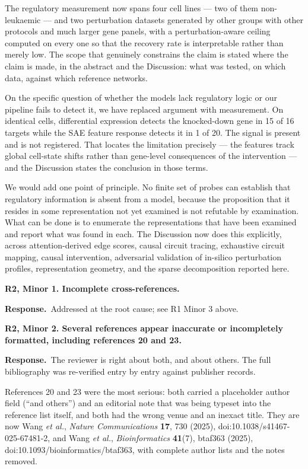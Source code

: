 \documentclass[11pt]{article}
\newcommand{\point}[1]{\vspace{0.7em}\noindent\textbf{#1}\par\vspace{0.15em}}
\newcommand{\reply}{\par\vspace{0.3em}\noindent\textbf{Response.}\ }
\begin{document}
The regulatory measurement now spans four cell lines --- two of them non-leukaemic --- and two
perturbation datasets generated by other groups with other protocols and much larger gene panels,
with a perturbation-aware ceiling computed on every one so that the recovery rate is interpretable
rather than merely low. The scope that genuinely constrains the claim is stated where the claim is
made, in the abstract and the Discussion: what was tested, on which data, against which reference
networks.

On the specific question of whether the models lack regulatory logic or our pipeline fails to
detect it, we have replaced argument with measurement. On identical cells, differential expression
detects the knocked-down gene in 15 of 16 targets while the SAE feature response detects it in 1 of
20. The signal is present and is not registered. That locates the limitation precisely --- the
features track global cell-state shifts rather than gene-level consequences of the intervention ---
and the Discussion states the conclusion in those terms.

We would add one point of principle. No finite set of probes can establish that regulatory
information is absent from a model, because the proposition that it resides in some representation
not yet examined is not refutable by examination. What can be done is to enumerate the
representations that have been examined and report what was found in each. The Discussion now does
this explicitly, across attention-derived edge scores, causal circuit tracing, exhaustive circuit
mapping, causal intervention, adversarial validation of in-silico perturbation profiles,
representation geometry, and the sparse decomposition reported here.

\point{R2, Minor 1. Incomplete cross-references.}
\reply Addressed at the root cause; see R1 Minor 3 above.

\point{R2, Minor 2. Several references appear inaccurate or incompletely formatted, including
references 20 and 23.}
\reply The reviewer is right about both, and about others. The full bibliography was re-verified
entry by entry against publisher records.

References 20 and 23 were the most serious: both carried a placeholder author field
(``and others'') and an editorial note that was being typeset into the reference list itself, and
both had the wrong venue and an inexact title. They are now
Wang \emph{et al.}, \emph{Nature Communications} \textbf{17}, 730 (2025),
doi:10.1038/s41467-025-67481-2, and
Wang \emph{et al.}, \emph{Bioinformatics} \textbf{41}(7), btaf363 (2025),
doi:10.1093/bioinformatics/btaf363, with complete author lists and the notes removed.
\end{document}
